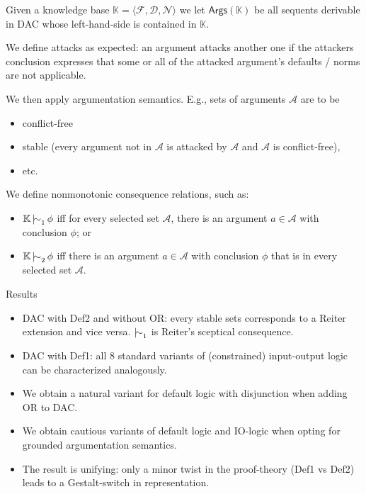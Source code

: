 \documentclass[aspectratio=169]{beamer}
\begin{document}
\begin{frame}[label={sec:org9d76563}]{}
Given a knowledge base \(\mathbb{K} = \langle \mathcal{F}, \mathcal{D}, \mathcal{N} \rangle\) we let \alert{\(\mathsf{Args}(\mathbb{K})\)} be all sequents derivable in DAC whose left-hand-side is contained in \(\mathbb{K}\).
\pause

We define \alert{attacks} as expected: an argument attacks another one if the attackers conclusion expresses that some or all of the attacked argument's defaults / norms are not applicable.
\pause

We then apply \alert{argumentation semantics}. E.g., sets of arguments \(\mathcal{A}\) are to be
\begin{itemize}
\item conflict-free
\item stable (every argument not in \(\mathcal{A}\) is attacked by \(\mathcal{A}\) and \(\mathcal{A}\) is conflict-free),
\item etc.
\end{itemize}
\pause

We define nonmonotonic \alert{consequence relations}, such as:
\begin{itemize}
\item \(\mathbb{K} \mathop{\mid\!\sim}_{1} \phi\) iff for every selected set \(\mathcal{A}\), there is an argument \(a \in \mathcal{A}\) with conclusion \(\phi\); or
\item \(\mathbb{K} \mathop{\mid\!\sim}_{2} \phi\) iff there is an argument \(a \in \mathcal{A}\) with conclusion \(\phi\) that is in every selected set \(\mathcal{A}\).
\end{itemize}
\end{frame}

\begin{frame}[label={sec:org09f854e}]{Results}
\begin{itemize}
\item DAC with Def2 and without OR: every stable sets corresponds to a \alert{Reiter} extension and vice versa. \(\mathop{\mid\!\sim}_1\) is Reiter's sceptical consequence. \pause
\item DAC with Def1: all 8 standard variants of (constrained) \alert{input-output logic} can be characterized analogously. \pause
\item We obtain a natural variant for \alert{default logic} with disjunction when adding OR to DAC. \pause
\item We obtain \alert{cautious variants} of default logic and IO-logic when opting for grounded argumentation semantics. \pause
\item The result is \alert{unifying}: only a minor twist in the proof-theory (Def1 vs Def2) leads to a Gestalt-switch in representation.
\end{itemize}
\end{frame}
\end{document}
